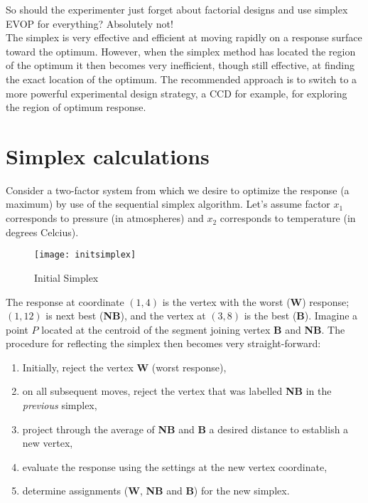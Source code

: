 So should the experimenter just forget about factorial designs and use simplex EVOP for everything?  Absolutely not!\\


The simplex is very effective and efficient at moving rapidly on a response surface toward the optimum.  However, when the simplex method has located the region of the optimum it then becomes very inefficient, though still effective, at finding the exact location of the optimum. The recommended approach is to switch to a more powerful experimental design strategy, a CCD for example, for exploring the region of optimum response.

\section{Simplex calculations}\label{simplex-calc}
Consider a two-factor system from which we desire to optimize the response (a maximum) by use of the sequential simplex algorithm.  Let's assume factor $x_{1}$ corresponds to pressure (in atmospheres)  and $x_{2}$ corresponds to temperature (in degrees Celcius).

\begin{figure}[h]\caption{Initial Simplex}\label{initsimplex}
\begin{center}
\texttt{[image: initsimplex]}
\end{center}
\end{figure}

The response at coordinate $(1,4)$ is the vertex with the worst (\textbf{W}) response; $(1,12)$ is next best (\textbf{NB}), and the vertex at $(3,8)$ is the best (\textbf{B}). Imagine a point $P$ located at the centroid of the segment joining vertex \textbf{B} and \textbf{NB}. The procedure for reflecting the simplex then becomes very straight-forward:

\begin{enumerate}
\item Initially, reject the vertex \textbf{W} (worst response),
\item on all subsequent moves, reject the vertex that was labelled \textbf{NB} in the \textit{previous} simplex,
\item project through the average of \textbf{NB} and \textbf{B} a desired distance to establish a new vertex,
\item evaluate the response using the settings at the new vertex coordinate,
\item determine assignments (\textbf{W}, \textbf{NB} and \textbf{B}) for the new simplex.
\end{enumerate}

